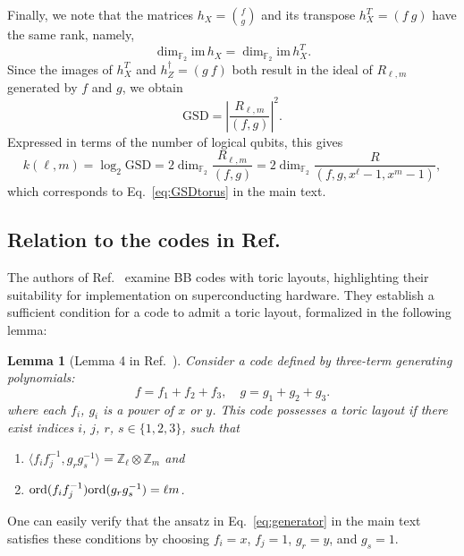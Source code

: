 \documentclass[aps,prl,english,superscriptaddress,twocolumn,tightenlines,showpacs,longbibliography,floatfix,amsfonts]{revtex4-2}
\newtheorem{lem}{Lemma}
\begin{document}
Finally, we note that the matrices $h_{X}={f \choose g}$ and its
transpose $h_{X}^{T}=\left(f\ g\right)$ have the same rank, namely,
\begin{equation}
	\dim_{\mathbb{F}_{2}}\text{im}\,h_{X}=\dim_{\mathbb{F}_{2}}\text{im}\,h_{X}^{T}.
\end{equation}
Since the images of $h_{X}^{T}$ and $h_{Z}^{\dagger}=\left(g\ f\right)$
both result in the ideal of $R_{\ell,m}$ generated by $f$ and $g$,
we obtain
\begin{equation}
	\text{GSD}=\left|\frac{R_{\ell,m}}{\left(f,g\right)}\right|^{2}.
\end{equation}
Expressed in terms of the number of logical qubits, this gives 
\begin{equation}
	k(\ell,m)=\log_{2}\mathrm{GSD}=2\dim_{\mathbb{F}_{2}}\frac{R_{\ell,m}}{\left(f,g\right)}=2\dim_{\mathbb{F}_{2}}\frac{R}{\left(f,g,x^{\ell}-1,x^{m}-1\right)},
\end{equation}
which corresponds to Eq.~\eqref{eq:GSDtorus} in the main text.


\subsection{Relation to the codes in Ref.~\cite{Bravyi24}}\label{subsec:ibm_code}
The authors of Ref.~\cite{Bravyi24} examine BB codes with toric layouts, highlighting their suitability for implementation on superconducting hardware. They establish a sufficient condition for a code to admit a toric layout, formalized in the following lemma:
\begin{lem}[Lemma 4 in Ref.~\cite{Bravyi24}]
	Consider a code defined by three-term generating polynomials:
	\begin{equation}
		f = f_1+f_2+f_3, \quad g = g_1+g_2+g_3.
	\end{equation}
	where each $f_i$, $g_i$ is a power of $x$ or $y$. This code possesses a toric layout if there exist indices $i$, $j$, $r$, $s\in \{1,2,3\}$, such that
	\begin{enumerate}
		\item $\langle f_if_j^{-1}, g_rg_s^{-1} \rangle = \mathbb{Z}_\ell \otimes \mathbb{Z}_m$ and 
		\item ${\rm ord}(f_if_j^{-1}){\rm ord}(g_rg_s^{-1})=\ell m$.
	\end{enumerate}
\end{lem}

One can easily verify that the ansatz in Eq.~\eqref{eq:generator} in the main text satisfies these conditions by choosing $f_i = x$, $f_j = 1$, $g_r = y$, and $g_s = 1$. 
\end{document}
